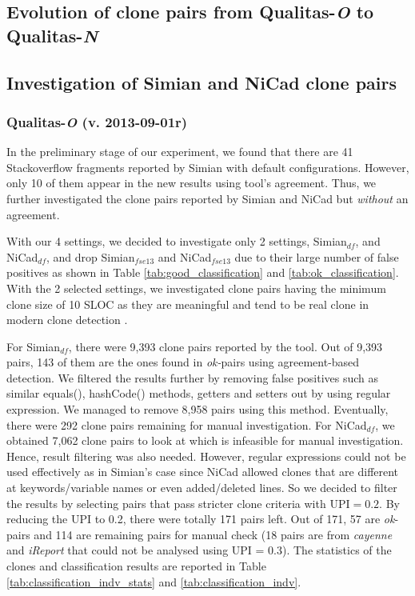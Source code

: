 \documentclass{IEEEtran}
\begin{document}
\subsection{Evolution of clone pairs from Qualitas-\textit{O} to Qualitas-\textit{N}}

\subsection{Investigation of Simian and NiCad clone pairs}
\subsubsection{Qualitas-\textit{O} (v. 2013-09-01r)}
In the preliminary stage of our experiment, we found that there are 41 Stackoverflow fragments reported by Simian with default configurations. However, only 10 of them appear in the new results using tool's agreement. Thus, we further investigated the clone pairs reported by Simian and NiCad but \textit{without} an agreement. 

With our 4 settings, we decided to investigate only 2 settings, Simian$_{df}$, and NiCad$_{df}$, and drop Simian$_{fse13}$ and NiCad$_{fse13}$ due to their large number of false positives as shown in Table \ref{tab:good_classification} and \ref{tab:ok_classification}. With the 2 selected settings, we investigated clone pairs having the minimum clone size of 10 SLOC as they are meaningful and tend to be real clone in modern clone detection \cite{Sajnani2016}. 

For Simian$_{df}$, there were 9,393 clone pairs reported by the tool. Out of 9,393 pairs, 143 of them are the ones found in \textit{ok-}pairs using agreement-based detection. We filtered the results further by removing false positives such as similar equals(), hashCode() methods, getters and setters out by using regular expression. We managed to remove 8,958 pairs using this method. Eventually, there were 292 clone pairs remaining for manual investigation. For NiCad$_{df}$, we obtained 7,062 clone pairs to look at which is infeasible for manual investigation. Hence, result filtering was also needed. However, regular expressions could not be used effectively as in Simian's case since NiCad allowed clones that are different at keywords/variable names or even added/deleted lines. So we decided to filter the results by selecting pairs that pass stricter clone criteria with $\mathrm{UPI} = 0.2$. By reducing the UPI to 0.2, there were totally 171 pairs left. Out of 171, 57 are \textit{ok}-pairs and 114 are remaining pairs for manual check (18 pairs are from \textit{cayenne} and \textit{iReport} that could not be analysed using UPI = 0.3). The statistics of the clones and classification results are reported in Table \ref{tab:classification_indv_stats} and \ref{tab:classification_indv}.
\end{document}
